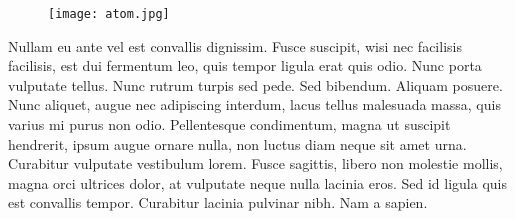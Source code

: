 \documentclass{article}
\begin{document}
\begin{multicols}{3}
{\begin{window}
\end{window}

\closearticle

}
\end{multicols}

\begin{figure*}[!b]
  \centering
  \texttt{[image: atom.jpg]}
\end{figure*}


\begin{multicols}{3}{
    Nullam eu ante vel est convallis dignissim.  Fusce suscipit, wisi
    nec facilisis facilisis, est dui fermentum leo, quis tempor ligula
    erat quis odio.  Nunc porta vulputate tellus.  Nunc rutrum turpis
    sed pede.  Sed bibendum.  Aliquam posuere.  Nunc aliquet, augue
    nec adipiscing interdum, lacus tellus malesuada massa, quis varius
    mi purus non odio.  Pellentesque condimentum, magna ut suscipit
    hendrerit, ipsum augue ornare nulla, non luctus diam neque sit
    amet urna.  Curabitur vulputate vestibulum lorem.  Fusce sagittis,
    libero non molestie mollis, magna orci ultrices dolor, at
    vulputate neque nulla lacinia eros.  Sed id ligula quis est
    convallis tempor.  Curabitur lacinia pulvinar nibh.  Nam a sapien.

  }
\end{multicols}
\end{document}
